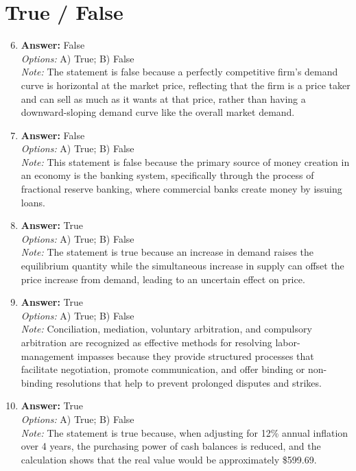 \documentclass[12pt]{article}
\begin{document}
\section*{True / False}
\begin{enumerate}[label=\arabic*.]
\setcounter{enumi}{5}
\item \textbf{Answer:} False
\\ \textit{Options:} A) True; B) False
\\ \textit{Note:} The statement is false because a perfectly competitive firm's demand curve is horizontal at the market price, reflecting that the firm is a price taker and can sell as much as it wants at that price, rather than having a downward-sloping demand curve like the overall market demand.
\item \textbf{Answer:} False
\\ \textit{Options:} A) True; B) False
\\ \textit{Note:} This statement is false because the primary source of money creation in an economy is the banking system, specifically through the process of fractional reserve banking, where commercial banks create money by issuing loans.
\item \textbf{Answer:} True
\\ \textit{Options:} A) True; B) False
\\ \textit{Note:} The statement is true because an increase in demand raises the equilibrium quantity while the simultaneous increase in supply can offset the price increase from demand, leading to an uncertain effect on price.
\item \textbf{Answer:} True
\\ \textit{Options:} A) True; B) False
\\ \textit{Note:} Conciliation, mediation, voluntary arbitration, and compulsory arbitration are recognized as effective methods for resolving labor-management impasses because they provide structured processes that facilitate negotiation, promote communication, and offer binding or non-binding resolutions that help to prevent prolonged disputes and strikes.
\item \textbf{Answer:} True
\\ \textit{Options:} A) True; B) False
\\ \textit{Note:} The statement is true because, when adjusting for 12\% annual inflation over 4 years, the purchasing power of cash balances is reduced, and the calculation shows that the real value would be approximately \$599.69.
\end{enumerate}
\end{document}
